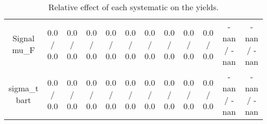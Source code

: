 \begin{table}[htbp]
\begin{center}
\begin{tabular}{|c|c|c|c|c|c|c|c|c|c|c|c|}
  Signal  mu_{F} & 0.0 / 0.0 & 0.0 / 0.0 & 0.0 / 0.0 & 0.0 / 0.0 & 0.0 / 0.0 & 0.0 / 0.0 & 0.0 / 0.0 & 0.0 / 0.0 & 0.0 / 0.0 & -nan / -nan & -nan / -nan \\ 
   sigma_{t bar{t}} & 0.0 / 0.0 & 0.0 / 0.0 & 0.0 / 0.0 & 0.0 / 0.0 & 0.0 / 0.0 & 0.0 / 0.0 & 0.0 / 0.0 & 0.0 / 0.0 & 0.0 / 0.0 & -nan / -nan & -nan / -nan \\ 
\hline 
\end{tabular} 
\caption{Relative effect of each systematic on the yields.} 
\end{center} 
\end{table} 
